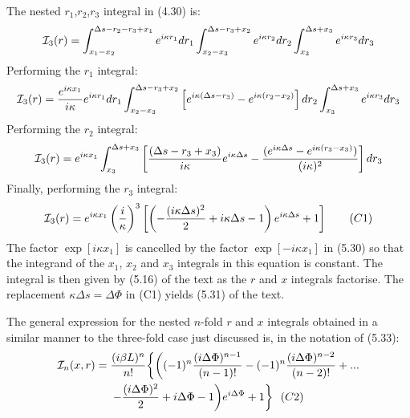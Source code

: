 \documentclass [12pt]{article}
\begin{document}
{  The nested $r_1$,$r_2$,$r_3$ integral in (4.30) is:
  \[ {\cal I}_{3}(r)= \int_{x_1-x_2}^{\Delta s-r_2-r_3+x_1} e^{i\kappa r_1}  d r_1
   \int_{x_2-x_3}^{\Delta s-r_3+x_2} e^{i\kappa r_2}  d r_2
   \int_{x_3}^{\Delta s+x_3} e^{i\kappa r_3}  d r_3 \]
    Performing the $r_1$ integral:
   \[ {\cal I}_{3}(r)= \frac{e^{i\kappa x_1}}{i\kappa} e^{i\kappa r_1}  d r_1
   \int_{x_2-x_3}^{\Delta s-r_3+x_2}\left[ e^{i\kappa(\Delta s-r_3)}
     -   e^{i\kappa(r_2- x_2)}\right] d r_2
   \int_{x_3}^{\Delta s+x_3} e^{i\kappa r_3}  d r_3 \]
    Performing the $r_2$ integral:
      \[ {\cal I}_{3}(r)= e^{i\kappa x_1}\int_{x_3}^{\Delta s+x_3}\left[
       \frac{(\Delta s-r_3+x_3)}{i\kappa} e^{i\kappa \Delta s}
      -\frac{(e^{i\kappa \Delta s}-e^{i\kappa(r_3-x_3)})}{(i\kappa)^2} \right] d r_3 \]
    Finally, performing the $r_3$ integral:
      \[ {\cal I}_{3}(r) =  e^{i\kappa x_1} \left(\frac{i}{\kappa}\right)^3
      \left[\left(-\frac{(i\kappa \Delta s)^2}{2}+i\kappa \Delta s -1\right)e^{i\kappa \Delta s}
        +1 \right]~~~~~~(C1) \]
      The factor $\exp[i\kappa x_1]$ is cancelled by the factor  $\exp[-i\kappa x_1]$ in (5.30)
      so that the integrand of the $x_1$, $x_2$ and $x_3$ integrals in this equation is constant.
      The integral is then given by (5.16) of the text as the $r$ and $x$ integrals
      factorise. The replacement $\kappa \Delta s = \Delta \Phi$ in (C1) yields (5.31) of the
      text. 
      \par The general expression for the nested $n$-fold $r$ and $x$ integrals
       obtained in a similar manner to the three-fold case just discussed is, in the 
      notation of (5.33):
      \begin{multline*}
      {\cal I}_{n}(x,r) =  \frac{(i\beta L)^n}{n!}
       \biggl\{\biggl((-1)^n \frac{(i \Delta \Phi)^{n-1}}{(n-1)!}
       - (-1)^n \frac{(i \Delta \Phi)^{n-2}}{(n-2)!}+...\\
       -\frac{(i \Delta \Phi)^2}{2}+i \Delta \Phi -1\biggr) e^{i \Delta \Phi}+1 \biggr\}~~(C2)
       \end{multline*}

 
 \newpage
}
\end{document}

